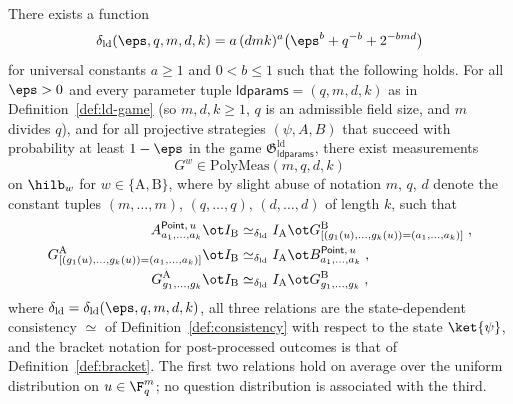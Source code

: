 \begin{theorem}\label{lem:ld-soundness}
	\leanok
	There exists a function
	\[
		\delta_{\mathrm{ld}}(\eps, q, m, d, k) = a\,(dmk)^a \bigl(\eps^b + q^{-b} + 2^{-bmd}\bigr)
	\]
	for universal constants $a \ge 1$ and $0 < b \le 1$ such that the following holds. For all $\eps > 0$ and every parameter tuple $\mathsf{ldparams} = (q,m,d,k)$ as in Definition~\ref{def:ld-game} (so $m, d, k \ge 1$, $q$ is an admissible field size, and $m$ divides $q$), and for all projective strategies $(\psi, A, B)$ that succeed with probability at least $1-\eps$ in the game $\mathfrak{G}^{\mathrm{ld}}_{\mathsf{ldparams}}$, there exist measurements
	\[
		G^w \in \mathrm{PolyMeas}(m,q,d,k)
	\]
	on $\hilb_w$ for $w \in \{\mathrm A,\mathrm B\}$, where by slight abuse of notation $m$, $q$, $d$ denote the constant tuples $(m,\ldots,m)$, $(q,\ldots,q)$, $(d,\ldots,d)$ of length $k$, such that
	\begin{align*}
		A^{\mathsf{Point},\, u}_{a_1,\ldots,a_k} \ot I_{\mathrm B}
		&\simeq_{\delta_{\mathrm{ld}}}
		I_{\mathrm A} \ot G^{\mathrm B}_{[(g_1(u),\ldots,g_k(u)) = (a_1,\ldots,a_k)]}\;,\\
		G^{\mathrm A}_{[(g_1(u),\ldots,g_k(u)) = (a_1,\ldots,a_k)]} \ot I_{\mathrm B}
		&\simeq_{\delta_{\mathrm{ld}}}
		I_{\mathrm A} \ot B^{\mathsf{Point},\, u}_{a_1,\ldots,a_k}\;,\\
		G^{\mathrm A}_{g_1,\ldots,g_k} \ot I_{\mathrm B}
		&\simeq_{\delta_{\mathrm{ld}}}
		I_{\mathrm A} \ot G^{\mathrm B}_{g_1,\ldots,g_k}\;,
	\end{align*}
	where $\delta_{\mathrm{ld}} = \delta_{\mathrm{ld}}(\eps,q,m,d,k)$, all three relations are the state-dependent consistency $\simeq$ of Definition~\ref{def:consistency} with respect to the state $\ket{\psi}$, and the bracket notation for post-processed outcomes is that of Definition~\ref{def:bracket}. The first two relations hold on average over the uniform distribution on $u \in \F_q^m$; no question distribution is associated with the third.
\end{theorem}
